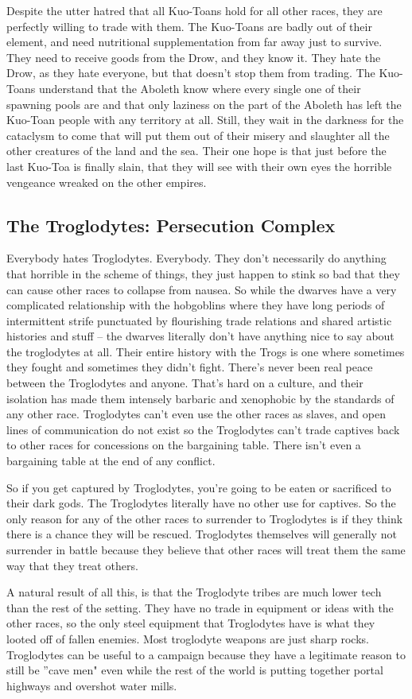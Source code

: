 Despite the utter hatred that all Kuo-Toans hold for all other races, they are perfectly willing to trade with them. The Kuo-Toans are badly out of their element, and need nutritional supplementation from far away just to survive. They need to receive goods from the Drow, and they know it. They hate the Drow, as they hate everyone, but that doesn't stop them from trading. The Kuo-Toans understand that the Aboleth know where every single one of their spawning pools are and that only laziness on the part of the Aboleth has left the Kuo-Toan people with any territory at all. Still, they wait in the darkness for the cataclysm to come that will put them out of their misery and slaughter all the other creatures of the land and the sea. Their one hope is that just before the last Kuo-Toa is finally slain, that they will see with their own eyes the horrible vengeance wreaked on the other empires.\\



\subsection{The Troglodytes: Persecution Complex}

Everybody hates Troglodytes. Everybody. They don't necessarily do anything that horrible in the scheme of things, they just happen to stink so bad that they can cause other races to collapse from nausea. So while the dwarves have a very complicated relationship with the hobgoblins where they have long periods of intermittent strife punctuated by flourishing trade relations and shared artistic histories and stuff -- the dwarves literally don't have anything nice to say about the troglodytes at all. Their entire history with the Trogs is one where sometimes they fought and sometimes they didn't fight. There's never been real peace between the Troglodytes and anyone. That's hard on a culture, and their isolation has made them intensely barbaric and xenophobic by the standards of any other race. Troglodytes can't even use the other races as slaves, and open lines of communication do not exist so the Troglodytes can't trade captives back to other races for concessions on the bargaining table. There isn't even a bargaining table at the end of any conflict.

So if you get captured by Troglodytes, you're going to be eaten or sacrificed to their dark gods. The Troglodytes literally have no other use for captives. So the only reason for any of the other races to surrender to Troglodytes is if they think there is a chance they will be rescued. Troglodytes themselves will generally not surrender in battle because they believe that other races will treat them the same way that they treat others.

A natural result of all this, is that the Troglodyte tribes are much lower tech than the rest of the setting. They have no trade in equipment or ideas with the other races, so the only steel equipment that Troglodytes have is what they looted off of fallen enemies. Most troglodyte weapons are just sharp rocks. Troglodytes can be useful to a campaign because they have a legitimate reason to still be ''cave men" even while the rest of the world is putting together portal highways and overshot water mills.
